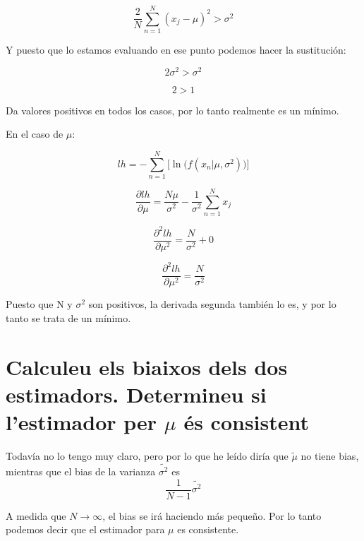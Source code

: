 \documentclass[a4paper,10pt]{article}
\begin{document}
\begin{equation*}
\frac{2}{N}\sum_{n = 1}^{N} (x_j - \mu)^2 > \sigma^2
\end{equation*}

Y puesto que lo estamos evaluando en ese punto podemos hacer la sustitución:

\begin{equation*}
2\sigma^2 > \sigma^2
\end{equation*}

\begin{equation*}
2 > 1
\end{equation*}

Da valores positivos en todos los casos, por lo tanto realmente es un mínimo.

En el caso de $\mu$:

\begin{equation*}
lh = - \sum_{n = 1}^{N} \Big[ \ln{\big( f(x_n | \mu, \sigma^2)\big)} \Big]
\end{equation*}

\begin{equation*}
\frac{\partial lh}{\partial \mu} = \frac{N\mu}{\sigma^2} - \frac{1}{\sigma^2}\sum_{n = 1}^{N} x_j
\end{equation*}

\begin{equation*}
\frac{\partial^2 lh}{\partial \mu^2} = \frac{N}{\sigma^2} + 0
\end{equation*}

\begin{equation*}
\frac{\partial^2 lh}{\partial \mu^2} = \frac{N}{\sigma^2}
\end{equation*}

Puesto que N y $\sigma^2$ son positivos, la derivada segunda también lo es, y por lo tanto se trata de un mínimo.

\section{Calculeu els biaixos dels dos estimadors. Determineu si l'estimador per $\mu$ és consistent}

Todavía no lo tengo muy claro, pero por lo que he leído diría que $\tilde{\mu}$ no tiene bias, mientras que el bias de la varianza $\tilde{\sigma^2}$ es
\begin{equation*}
\frac{1}{N - 1}\tilde{\sigma^2}
\end{equation*}

A medida que $N \rightarrow \infty$, el bias se irá haciendo más pequeño. Por lo tanto podemos decir que el estimador para $\mu$  es consistente.
\end{document}
